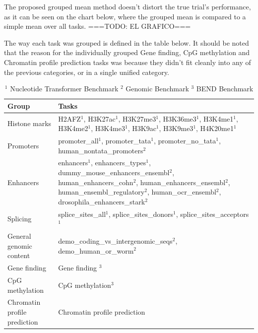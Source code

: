 \documentclass[   ]{article}
\begin{document}
The proposed grouped mean method doesn't distort the true trial's performance, as it can be seen on the chart below, where the grouped mean is compared to a simple mean over all tasks.
===TODO: EL GRAFICO===

The way each task was grouped is defined in the table below. It should be noted that the reason for the individually grouped Gene finding, CpG methylation and Chromatin profile prediction tasks was because they didn't fit cleanly into any of the previous categories, or in a single unified category.


\begin{table}[H]
	\centering
	\begin{tabular}{@{} l p{10cm} @{}}
		\toprule
		\textbf{Group} & \textbf{Tasks} \\
		\midrule
		Histone marks &
		H2AFZ$^1$, H3K27ac$^1$, H3K27me3$^1$, H3K36me3$^1$, H3K4me1$^1$, H3K4me2$^1$, H3K4me3$^1$, H3K9ac$^1$, H3K9me3$^1$, H4K20me1$^1$ \\
		\midrule
		Promoters &
		promoter\_all$^1$, promoter\_tata$^1$, promoter\_no\_tata$^1$, human\_nontata\_promoters$^2$ \\
		\midrule
		Enhancers &
		enhancers$^1$, enhancers\_types$^1$, dummy\_mouse\_enhancers\_ensembl$^2$, human\_enhancers\_cohn$^2$, human\_enhancers\_ensembl$^2$, human\_ensembl\_regulatory$^2$, human\_ocr\_ensembl$^2$, drosophila\_enhancers\_stark$^2$ \\
		\midrule
		Splicing &
		splice\_sites\_all$^1$, splice\_sites\_donors$^1$, splice\_sites\_acceptors$^1$ \\
		\midrule
		General genomic content &
		demo\_coding\_vs\_intergenomic\_seqs$^2$, demo\_human\_or\_worm$^2$ \\
		\midrule
		Gene finding &
		Gene finding $^3$ \\
		\midrule
		CpG methylation &
		CpG methylation$^3$ \\
		\midrule
		Chromatin profile prediction &
		Chromatin profile prediction \\
		\bottomrule
	\end{tabular}
	\caption*{$^1$ Nucleotide Transformer Benchmark \quad
		$^2$ Genomic Benchmark \quad
		$^3$ BEND Benchmark}
	\label{tab:task_grouping}
\end{table}
\end{document}

